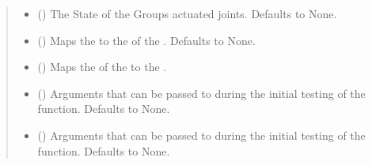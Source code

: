 \documentclass[letterpaper,10pt,english]{sphinxmanual}
\begin{document}
\begin{fulllineitems}
\begin{quote}
\begin{description}
\begin{itemize}
\item {} 
 (\sphinxstyleliteralemphasis{\sphinxupquote{{[}}}\sphinxstyleliteralemphasis{\sphinxupquote{{[}}}\sphinxstyleliteralemphasis{\sphinxupquote{, }}\sphinxstyleliteralemphasis{\sphinxupquote{{]}}}\sphinxstyleliteralemphasis{\sphinxupquote{{]}}}\sphinxstyleliteralemphasis{\sphinxupquote{, }}) \textendash{} The State of the Groups actuated joints. Defaults to None.

\item {} 
 (\sphinxstyleliteralemphasis{\sphinxupquote{, }}) \textendash{} Maps the  to the  of the . Defaults to None.

\item {} 
 (\sphinxstyleliteralemphasis{\sphinxupquote{, }}) \textendash{} Maps the  of the  to the .

\item {} 
 (\sphinxstyleliteralemphasis{\sphinxupquote{{[}}}\sphinxstyleliteralemphasis{\sphinxupquote{{]}}}\sphinxstyleliteralemphasis{\sphinxupquote{, }}) \textendash{} Arguments that can be passed to  during the initial testing of the function. Defaults to None.

\item {} 
 (\sphinxstyleliteralemphasis{\sphinxupquote{{[}}}\sphinxstyleliteralemphasis{\sphinxupquote{{]}}}\sphinxstyleliteralemphasis{\sphinxupquote{, }}) \textendash{} Arguments that can be passed to  during the initial testing of the function. Defaults to None.


\end{itemize}
\end{description}
\end{quote}
\end{fulllineitems}
\end{document}
